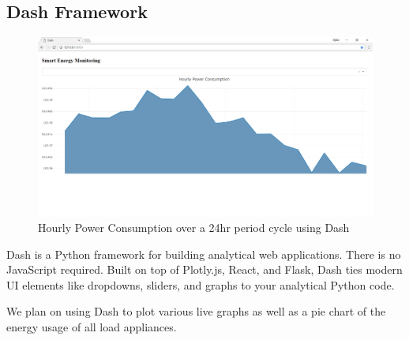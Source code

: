 \subsection{Dash Framework}{
\begin{figure}[H]
	    \includegraphics[scale=0.25]{images/dash.jpg}
	    \centering
	    \caption{Hourly Power Consumption over a 24hr period cycle using Dash}
	    \label{Dash}
	\end{figure}
	



Dash is a Python framework for building analytical web applications. There is no JavaScript required.
Built on top of Plotly.js, React, and Flask, Dash ties modern UI elements like dropdowns, sliders, and graphs to your analytical Python code.

We plan on using Dash to plot various live graphs as well as a pie chart of the energy usage of all load appliances.
}